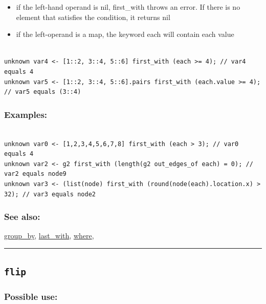 \documentclass[]{book}
\providecommand{\tightlist}{%
  \setlength{\itemsep}{0pt}\setlength{\parskip}{0pt}}
\theoremstyle{definition}
\theoremstyle{definition}
\theoremstyle{definition}
\theoremstyle{remark}
\begin{document}
\begin{itemize}
\tightlist
\item
  if the left-hand operand is nil, first\_with throws an error. If there
  is no element that satisfies the condition, it returns nil\\
\item
  if the left-operand is a map, the keyword each will contain each value
\end{itemize}

\begin{verbatim}
 
unknown var4 <- [1::2, 3::4, 5::6] first_with (each >= 4); // var4 equals 4 
unknown var5 <- [1::2, 3::4, 5::6].pairs first_with (each.value >= 4); // var5 equals (3::4)
\end{verbatim}

\subsubsection{Examples:}\label{examples-124}

\begin{verbatim}
 
unknown var0 <- [1,2,3,4,5,6,7,8] first_with (each > 3); // var0 equals 4 
unknown var2 <- g2 first_with (length(g2 out_edges_of each) = 0); // var2 equals node9 
unknown var3 <- (list(node) first_with (round(node(each).location.x) > 32); // var3 equals node2
\end{verbatim}

\subsubsection{See also:}\label{see-also-95}

\href{operators-d-to-h.html\#group_by}{group\_by},
\href{operators-i-to-m.html\#last_with}{last\_with},
\href{operators-s-to-z.html\#where}{where},

\begin{center}\rule{0.5\linewidth}{\linethickness}\end{center}

\subsection{\texorpdfstring{\texttt{flip}}{flip}}\label{flip}

\subsubsection{Possible use:}\label{possible-use-169}
\end{document}
